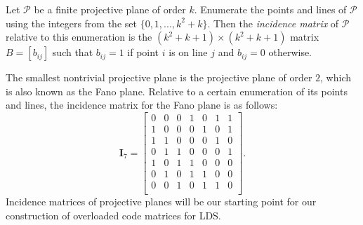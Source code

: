 \documentclass[journal,comsoc]{IEEEtran}
\begin{document}
Let $\mathcal{P}$ be a finite projective plane of order $k$. Enumerate the points and lines of $\mathcal{P}$ using the integers from the set $\lbrace 0,1,...,k^2+k \rbrace$. Then the \emph{incidence matrix} of $\mathcal{P}$ relative to this enumeration is the $(k^2+k+1)\times(k^2+k+1)$ matrix $B = [b_{ij}]$ such that $b_{ij}=1$ if point $i$ is on line $j$ and $b_{ij}=0$ otherwise.

The smallest nontrivial projective plane is the projective plane of order $2$, which is also known as the Fano plane. Relative to a certain enumeration of its points and lines, the incidence matrix for the Fano plane is as follows:
\begin{equation}
\mathbf{I}_{7}=\begin{bmatrix} 0 & 0 & 0 & 1 & 0 & 1 & 1 \\
1 & 0 & 0 & 0 & 1 & 0 & 1 \\
1 & 1 & 0 & 0 & 0 & 1 & 0 \\
0 & 1 & 1 & 0 & 0 & 0 & 1 \\
1 & 0 & 1 & 1 & 0 & 0 & 0 \\
0 & 1 & 0 & 1 & 1 & 0 & 0 \\
0 & 0 & 1 & 0 & 1 & 1 & 0 \\
\end{bmatrix}.
\end{equation}
Incidence matrices of projective planes will be our starting point for our construction of overloaded code matrices for LDS. \iffalse We will construct our code matrices by modifying and adding to the column vectors in these incidence matrices. \fi

\iffalse
\subsection{The Vector Space Construction}
Proofs of the claim made in this subsection can also be found in any standard projective geometry textbook (such as \cite{Beutelspacher1998}).

Let $q$ be a prime power. Let $V = \mathbb{F}_q^3$ be the $3$-dimensional vector space developed over $\mathbb{F}_q$. Let $P(V)$ be the incidence structure comprised of points and lines defined as follows. The points have the form 
$\overline{p}\setminus \lbrace \mathbf{0} \rbrace$ where $\overline{p}$ is a one-dimensional subspace of $V$. The lines have the form $\overline{\ell}\setminus \lbrace \mathbf{0} \rbrace$, where $\overline{\ell}$ is a two-dimensional subspace of $V$. We say that a point $\overline{p} \setminus \lbrace \mathbf{0} \rbrace$ lies on a line $\overline{\ell} \setminus \lbrace \mathbf{0} \rbrace$ if $\overline{p} \subset \overline{\ell}.$ It turns out that $P(V)$ is a projective plane of order $q$.\fi
\end{document}

